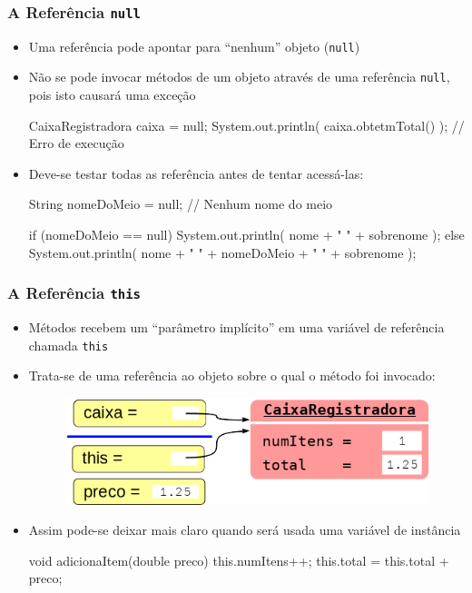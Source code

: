 \documentclass[xcolor={dvipsnames,table},aspectratio=169]{beamer}
\begin{document}
\begin{frame}[fragile]\frametitle{A Referência \texttt{null}}
\begin{itemize}
	\item Uma referência pode apontar para ``nenhum'' objeto (\texttt{null})
	\item Não se pode invocar métodos de um objeto através de uma referência \texttt{null}, pois isto causará uma exceção
{\footnotesize
\begin{javacode}
CaixaRegistradora caixa = null;
System.out.println( caixa.obtetmTotal() );   // Erro de execução
\end{javacode}
}
	\item Deve-se testar todas as referência antes de tentar acessá-las:
{\footnotesize
\begin{javacode}
String nomeDoMeio = null; // Nenhum nome do meio

if (nomeDoMeio == null)
  System.out.println( nome + " " + sobrenome );
else
  System.out.println( nome + " " + nomeDoMeio + " " + sobrenome );
\end{javacode}
}
\end{itemize}
\end{frame}

\begin{frame}[fragile]\frametitle{A Referência \texttt{this}}
\begin{itemize}
	\item Métodos recebem um ``parâmetro implícito'' em uma variável de referência chamada \texttt{this}
	\item Trata-se de uma referência ao objeto sobre o qual o método foi invocado:
\begin{figure}[h]
	\includegraphics[height=0.2\paperheight,center]{pucrs-ep-fprog-unidade_07-objetos_e_classes-laminas-this.png}
\end{figure}
	\item Assim pode-se deixar mais claro quando será usada uma variável de instância
\begin{javacode}
void adicionaItem(double preco) {
  this.numItens++;
  this.total = this.total + preco;
}
\end{javacode}
\end{itemize}
\end{frame}
\end{document}
